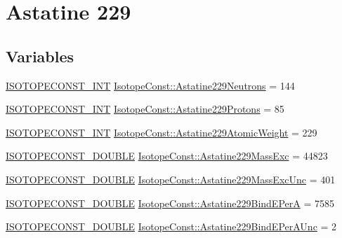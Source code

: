 \hypertarget{group___isotope_const-_astatine-_at229}{}\section{Astatine 229}
\label{group___isotope_const-_astatine-_at229}
\subsection*{Variables}
\begin{DoxyCompactItemize}
\item 
\mbox{\hyperlink{group___isotope_const-_macros_ga5f18360b3e99483a35c32d789e62621c}{I\+S\+O\+T\+O\+P\+E\+C\+O\+N\+S\+T\+\_\+\+I\+NT}} \mbox{\hyperlink{group___isotope_const-_astatine-_at229_ga4a49482d39bfe137251ccff28e0791d3}{Isotope\+Const\+::\+Astatine229\+Neutrons}} = 144
\item 
\mbox{\hyperlink{group___isotope_const-_macros_ga5f18360b3e99483a35c32d789e62621c}{I\+S\+O\+T\+O\+P\+E\+C\+O\+N\+S\+T\+\_\+\+I\+NT}} \mbox{\hyperlink{group___isotope_const-_astatine-_at229_gac389bfad6fa046a947c4c52e6773f0e7}{Isotope\+Const\+::\+Astatine229\+Protons}} = 85
\item 
\mbox{\hyperlink{group___isotope_const-_macros_ga5f18360b3e99483a35c32d789e62621c}{I\+S\+O\+T\+O\+P\+E\+C\+O\+N\+S\+T\+\_\+\+I\+NT}} \mbox{\hyperlink{group___isotope_const-_astatine-_at229_ga771ce1043b633f8b7dc1098ea69a9061}{Isotope\+Const\+::\+Astatine229\+Atomic\+Weight}} = 229
\item 
\mbox{\hyperlink{group___isotope_const-_macros_ga8f45a7272ce02c0b4c65c44636ed719a}{I\+S\+O\+T\+O\+P\+E\+C\+O\+N\+S\+T\+\_\+\+D\+O\+U\+B\+LE}} \mbox{\hyperlink{group___isotope_const-_astatine-_at229_gade4a10083ffae75b5da76a80e8b998df}{Isotope\+Const\+::\+Astatine229\+Mass\+Exc}} = 44823
\item 
\mbox{\hyperlink{group___isotope_const-_macros_ga8f45a7272ce02c0b4c65c44636ed719a}{I\+S\+O\+T\+O\+P\+E\+C\+O\+N\+S\+T\+\_\+\+D\+O\+U\+B\+LE}} \mbox{\hyperlink{group___isotope_const-_astatine-_at229_ga5a4bbc9490000f07ac2c716bb543b409}{Isotope\+Const\+::\+Astatine229\+Mass\+Exc\+Unc}} = 401
\item 
\mbox{\hyperlink{group___isotope_const-_macros_ga8f45a7272ce02c0b4c65c44636ed719a}{I\+S\+O\+T\+O\+P\+E\+C\+O\+N\+S\+T\+\_\+\+D\+O\+U\+B\+LE}} \mbox{\hyperlink{group___isotope_const-_astatine-_at229_gaba8d4a2b6521b0e2cac7a4dd8c6d62c6}{Isotope\+Const\+::\+Astatine229\+Bind\+E\+PerA}} = 7585
\item 
\mbox{\hyperlink{group___isotope_const-_macros_ga8f45a7272ce02c0b4c65c44636ed719a}{I\+S\+O\+T\+O\+P\+E\+C\+O\+N\+S\+T\+\_\+\+D\+O\+U\+B\+LE}} \mbox{\hyperlink{group___isotope_const-_astatine-_at229_gafecaeaac80aa80d11af2cce55eefcc3f}{Isotope\+Const\+::\+Astatine229\+Bind\+E\+Per\+A\+Unc}} = 2

\end{DoxyCompactItemize}
